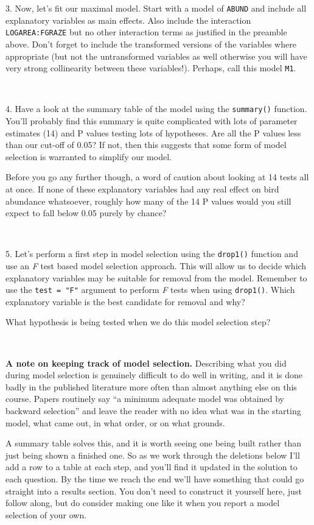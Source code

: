\documentclass[
]{article}
\newcounter{none} %
\begin{document}
3. Now, let's fit our maximal model. Start with a model of
\texttt{ABUND} and include all explanatory variables as main effects.
Also include the interaction \texttt{LOGAREA:FGRAZE} but no other
interaction terms as justified in the preamble above. Don't forget to
include the transformed versions of the variables where appropriate (but
not the untransformed variables as well otherwise you will have very
strong collinearity between these variables!). Perhaps, call this model
\texttt{M1}.

~

4. Have a look at the summary table of the model using the
\texttt{summary()} function. You'll probably find this summary is quite
complicated with lots of parameter estimates (14) and P values testing
lots of hypotheses. Are all the P values less than our cut-off of 0.05?
If not, then this suggests that some form of model selection is
warranted to simplify our model.

Before you go any further though, a word of caution about looking at 14
tests all at once. If none of these explanatory variables had any real
effect on bird abundance whatsoever, roughly how many of the 14 P values
would you still expect to fall below 0.05 purely by chance?

~

5. Let's perform a first step in model selection using the
\texttt{drop1()} function and use an \emph{F} test based model selection
approach. This will allow us to decide which explanatory variables may
be suitable for removal from the model. Remember to use the
\texttt{test\ =\ "F"} argument to perform \emph{F} tests when using
\texttt{drop1()}. Which explanatory variable is the best candidate for
removal and why?

What hypothesis is being tested when we do this model selection step?

~

\textbf{A note on keeping track of model selection.} Describing what you
did during model selection is genuinely difficult to do well in writing,
and it is done badly in the published literature more often than almost
anything else on this course. Papers routinely say ``a minimum adequate
model was obtained by backward selection'' and leave the reader with no
idea what was in the starting model, what came out, in what order, or on
what grounds.

A summary table solves this, and it is worth seeing one being built
rather than just being shown a finished one. So as we work through the
deletions below I'll add a row to a table at each step, and you'll find
it updated in the solution to each question. By the time we reach the
end we'll have something that could go straight into a results section.
You don't need to construct it yourself here, just follow along, but do
consider making one like it when you report a model selection of your
own.
\end{document}
